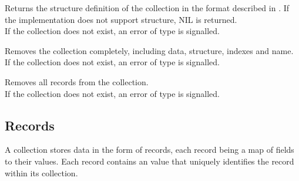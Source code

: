 Returns the structure definition of the collection in the format described in . If the implementation does not support structure, NIL is returned. \\

\noindent If the collection does not exist, an error of type  is signalled.

Removes the collection completely, including data, structure, indexes and name. \\

\noindent If the collection does not exist, an error of type  is signalled.

Removes all records from the collection. \\

\noindent If the collection does not exist, an error of type  is signalled.

\subsection{Records}
A collection stores data in the form of records, each record being a map of fields to their values. Each record contains an  value that uniquely identifies the record within its collection.

